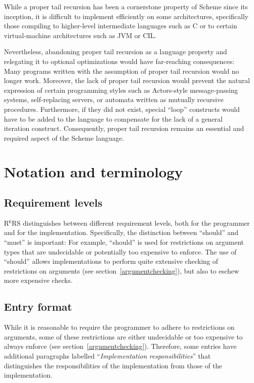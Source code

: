 \documentclass[twoside,twocolumn]{algol60}
\newcommand{\rn}[1]{R$^{#1}$RS}
\begin{document}
While a proper tail recursion has been a cornerstone property of
Scheme since its inception, it is difficult to implement efficiently
on some architectures, specifically those compiling to higher-level
intermediate languages such as C or to certain virtual-machine
architectures such as JVM or CIL.

Nevertheless, abandoning proper tail recursion as a language property
and relegating it to optional optimizations would have far-reaching
consequences: Many programs written with the assumption of proper tail
recursion would no longer work.  Moreover, the lack of proper tail
recursion would prevent the natural expression of certain programming
styles such as Actors-style message-passing systems, self-replacing
servers, or automata written as mutually recursive procedures.
Furthermore, if they did not exist, special ``loop'' constructs would
have to be added to the language to compensate for the lack of a general
iteration construct.  Consequently, proper tail recursion remains an
essential and required aspect of the Scheme language.

\chapter{Notation and terminology}

\section{Requirement levels}

\rn{6} distinguishes between different requirement levels, both for
the programmer and for the implementation.  Specifically, the
distinction between ``should'' and ``must'' is important: For example,
``should'' is used for restrictions on argument types that are
undecidable or potentially too expensive to enforce.  The use of
``should'' allows implementations to perform quite extensive checking
of restrictions on arguments (see section~\ref{argumentchecking}), but
also to eschew more expensive checks.

\section{Entry format}

While it is reasonable to require the programmer to adhere to
restrictions on arguments, some of these restrictions are either
undecidable or too expensive to always enforce (see
section~\ref{argumentchecking}).  Therefore, some entries have
additional paragraphs labelled ``\textit{Implementation
  responsibilities}'' that distinguishes the responsibilities of the
implementation from those of the implementation.
\end{document}
